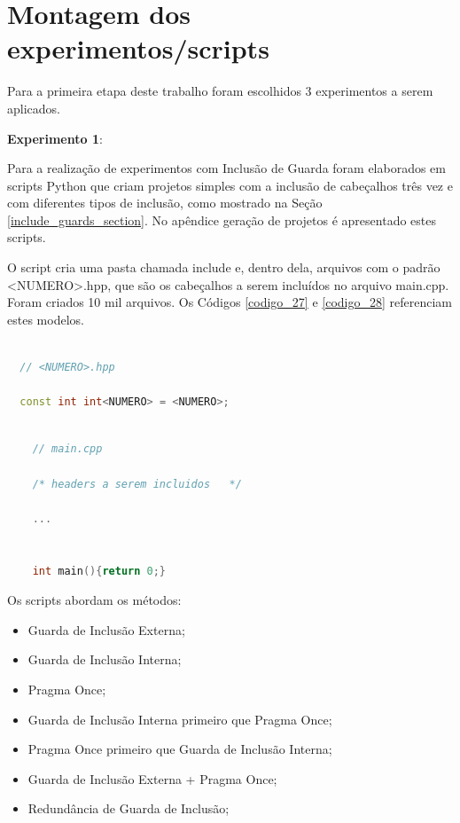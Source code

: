 \section{Montagem dos experimentos/scripts}

Para a primeira etapa deste trabalho foram escolhidos 3 experimentos a
 serem aplicados.

\textbf{Experimento 1}:\label{experimento_1}

Para a realização de experimentos com Inclusão de Guarda foram elaborados
 em scripts Python que criam projetos simples com a inclusão de cabeçalhos
 três vez e com diferentes tipos de inclusão, como mostrado na  Seção
 \ref{include_guards_section}.
 No apêndice geração de projetos é apresentado estes scripts.

O script cria uma pasta chamada include e, dentro dela, arquivos com o padrão
 <NUMERO>.hpp, que são os cabeçalhos a serem incluídos no arquivo main.cpp.
 Foram criados 10 mil arquivos. Os Códigos \ref{codigo_27} e  \ref{codigo_28}
 referenciam estes modelos.



\begin{lstlisting}[language=C++,frame=single,captionpos=b,caption={Modelo de
									 Arquivo .hpp gerado pelos scripts de 
									  guardas de inclusão},
                                                   label=codigo_27]

  // <NUMERO>.hpp

  const int int<NUMERO> = <NUMERO>;

\end{lstlisting}



\begin{lstlisting}[language=C++,frame=single,captionpos=b,caption={Modelo de
                               Arquivo main.cpp criado pelos scripts de
                                                     guardas de inclusão},
                                                          label=codigo_28]

    // main.cpp

    /* headers a serem incluidos   */

    ...


    int main(){return 0;}

\end{lstlisting}




Os scripts abordam os métodos:

\begin{itemize}
	\item Guarda de Inclusão Externa;
	\item Guarda de Inclusão Interna;
	\item Pragma Once;
	\item Guarda de Inclusão Interna primeiro que Pragma Once;
	\item Pragma Once primeiro que  Guarda de Inclusão Interna;
	\item Guarda de Inclusão Externa + Pragma Once;
	\item Redundância de Guarda de Inclusão;
\end{itemize}


